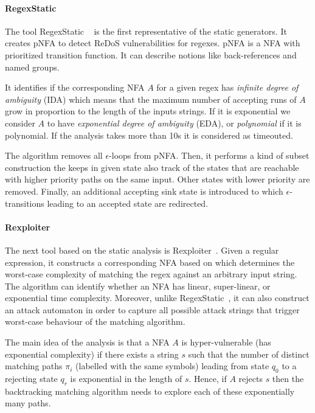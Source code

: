 \documentclass[acmsmall,screen]{acmart}
\begin{document}
%



\paragraph{RegexStatic}
The tool RegexStatic ~\cite{weideman} is the first representative of the static generators.
% 
It creates pNFA to detect ReDoS vulnerabilities for regexes.
%
pNFA is a NFA with prioritized transition function. 
%
It can describe notions like back-references and named groups. 
%

It identifies if the corresponding NFA $A$ for a given regex has \emph{infinite degree of ambiguity} (IDA) which means that the maximum number of accepting runs of $A$ grow in proportion to the length of the inputs strings. 
%
If it is exponential we consider $A$ to have \emph{exponential degree of ambiguity} (EDA), or \emph{polynomial} if it is polynomial. 
%
If the analysis takes more than 10s it is considered as timeouted.


The algorithm removes all $\epsilon$-loops from pNFA.
%
Then, it performs a kind of subset construction the keeps in given state also track of the states that are reachable with higher priority paths on the same input. 
%
Other states with lower priority are removed. 
%
Finally, an additional accepting sink state is introduced to which $\epsilon$-transitions leading to an accepted state are redirected.
 
%




\paragraph{Rexploiter}
The next tool based on the static analysis is  Rexploiter~\cite{rexploiter}. 
%
Given a regular expression, 
it constructs a corresponding NFA based on which determines the worst-case complexity of matching the regex
against an arbitrary input string.
%
The algorithm can identify whether an NFA has linear, super-linear, or exponential time complexity.
%
Moreover, unlike RegexStatic~\cite{weideman}, it can also construct an attack automaton in order to capture all possible attack strings 
that trigger worst-case behaviour of the matching algorithm.

The main idea of the analysis is that a NFA $A$ is hyper-vulnerable (has exponential complexity)
if there exists a string $s$ such that the number of distinct matching paths $\pi_i$ (labelled with the same symbols) leading from state $q_0$ to a rejecting
state $q_r$ is exponential in the length of $s$.
%
Hence, if $A$ rejects $s$ then the backtracking matching algorithm needs to explore each of these exponentially many paths.
%
\end{document}
